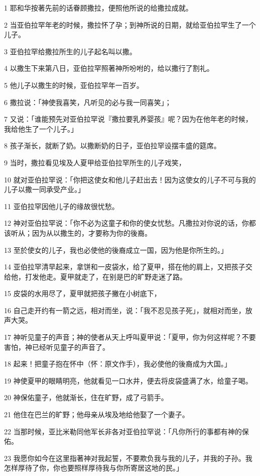 \par 1 耶和华按著先前的话眷顾撒拉，便照他所说的给撒拉成就。
\par 2 当亚伯拉罕年老的时候，撒拉怀了孕；到神所说的日期，就给亚伯拉罕生了一个儿子。
\par 3 亚伯拉罕给撒拉所生的儿子起名叫以撒。
\par 4 以撒生下来第八日，亚伯拉罕照著神所吩咐的，给以撒行了割礼。
\par 5 他儿子以撒生的时候，亚伯拉罕年一百岁。
\par 6 撒拉说：「神使我喜笑，凡听见的必与我一同喜笑」；
\par 7 又说：「谁能预先对亚伯拉罕说『撒拉要乳养婴孩』呢？因为在他年老的时候，我给他生了一个儿子。」
\par 8 孩子渐长，就断了奶。以撒断奶的日子，亚伯拉罕设摆丰盛的筵席。
\par 9 当时，撒拉看见埃及人夏甲给亚伯拉罕所生的儿子戏笑，
\par 10 就对亚伯拉罕说：「你把这使女和他儿子赶出去！因为这使女的儿子不可与我的儿子以撒一同承受产业。」
\par 11 亚伯拉罕因他儿子的缘故很忧愁。
\par 12 神对亚伯拉罕说：「你不必为这童子和你的使女忧愁。凡撒拉对你说的话，你都该听从；因为从以撒生的，才要称为你的後裔。
\par 13 至於使女的儿子，我也必使他的後裔成立一国，因为他是你所生的。」
\par 14 亚伯拉罕清早起来，拿饼和一皮袋水，给了夏甲，搭在他的肩上，又把孩子交给他，打发他走。夏甲就走了，在别是巴的旷野走迷了路。
\par 15 皮袋的水用尽了，夏甲就把孩子撇在小树底下，
\par 16 自己走开约有一箭之远，相对而坐，说：「我不忍见孩子死」，就相对而坐，放声大哭。
\par 17 神听见童子的声音；神的使者从天上呼叫夏甲说：「夏甲，你为何这样呢？不要害怕，神已经听见童子的声音了。
\par 18 起来！把童子抱在怀中（怀：原文作手），我必使他的後裔成为大国。」
\par 19 神使夏甲的眼睛明亮，他就看见一口水井，便去将皮袋盛满了水，给童子喝。
\par 20 神保佑童子，他就渐长，住在旷野，成了弓箭手。
\par 21 他住在巴兰的旷野；他母亲从埃及地给他娶了一个妻子。
\par 22 当那时候，亚比米勒同他军长非各对亚伯拉罕说：「凡你所行的事都有神的保佑。
\par 23 我愿你如今在这里指著神对我起誓，不要欺负我与我的儿子，并我的子孙。我怎样厚待了你，你也要照样厚待我与你所寄居这地的民。」
